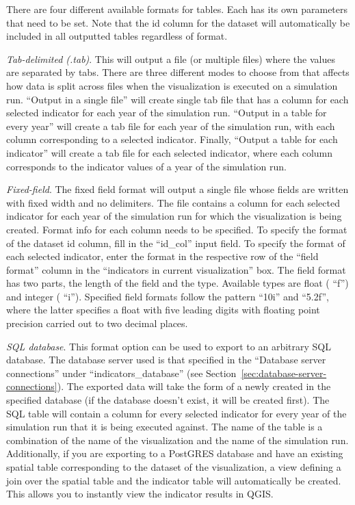 
There are four different available formats for tables. Each has its
own parameters that need to be set. Note that the id column for the
dataset will automatically be included in all outputted tables
regardless of format.

\emph{Tab-delimited (.tab)}. This will output a file (or multiple
files) where the values are separated by tabs. There are three
different modes to choose from that affects how data is split across
files when the visualization is executed on a simulation run.
``Output in a single file'' will create single tab file that has a
column for each selected indicator for each year of the simulation
run. ``Output in a table for every year'' will create a tab file
for each year of the simulation run, with each column
corresponding to a selected indicator. Finally, 
``Output a table for each indicator'' will create a tab file for
each selected indicator, where each column
corresponds to the indicator values of a year of the
simulation run.

\emph{Fixed-field}. The fixed field format will output a single file
whose fields are written with fixed width and no delimiters. The file
contains a column for each selected indicator for each year of the
simulation run for which the visualization is being created. Format
info for each column needs to be specified. To specify the format of
the dataset id column, fill in the ``id\_col'' input field. To
specify the format of each selected indicator, enter the format in the
respective row of the ``field format'' column in the  ``indicators in
current visualization'' box. The field format has two parts, the length
of the field and the type. Available types are float ( ``f'') and
integer ( ``i''). Specified field formats follow the pattern  ``10i'' and
 ``5.2f'', where the latter specifies a float with five leading digits
with floating point precision carried out to two decimal places.

\emph{SQL database}. This format option can be used to export to an
arbitrary SQL database. The database server used is that specified in
the ``Database server connections'' under  ``indicators\_database''
(see Section~\ref{sec:database-server-connections}). The exported data
will take the form of a newly created in the specified database (if the database doesn't exist, it will be created
first). The SQL table will contain a column for every selected
indicator for every year of the simulation run that it is being
executed against. The name of the table is a combination of the name of
the visualization and the name of the simulation run. Additionally,
if you are exporting to a PostGRES database and have an existing
spatial table corresponding to the dataset of the visualization, a view
defining a join over the spatial table and the indicator table will
automatically be created. This allows you to instantly view the
indicator results in QGIS. 

